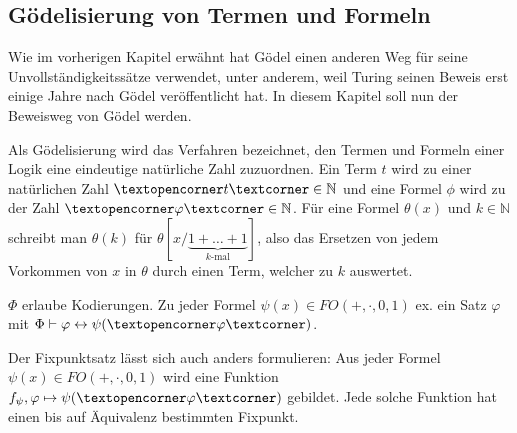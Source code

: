 \subsection{Gödelisierung von Termen und Formeln}

Wie im vorherigen Kapitel erwähnt hat Gödel einen anderen Weg für seine Unvollständigkeitssätze verwendet, unter anderem, weil Turing seinen Beweis erst einige Jahre nach Gödel veröffentlicht hat. In diesem Kapitel soll nun der Beweisweg von Gödel werden.

Als Gödelisierung wird das Verfahren bezeichnet, den Termen und Formeln einer Logik eine eindeutige natürliche Zahl zuzuordnen. Ein Term $t$ wird zu einer natürlichen Zahl $\opencorner t\closecorner\in \mathbb{N}$ und eine Formel $\phi$ wird zu der Zahl $\opencorner\varphi\closecorner\in \mathbb{N}$. Für eine Formel $\theta(x)$ und $k\in \mathbb{N}$ schreibt man $\theta(k)$ für $\theta[x/\underbrace{1+\dots+1}_{k\text{-mal}}]$, also das Ersetzen von jedem Vorkommen von $x$ in $\theta$ durch einen Term, welcher zu $k$ auswertet.

\begin{satz}[Fixpunktsatz]
	$\Phi$ erlaube Kodierungen. Zu jeder Formel $\psi(x)\in FO({+,\cdot,0,1})$ ex. ein Satz $\varphi$ mit $\Phi\vdash\varphi\leftrightarrow\psi(\opencorner \varphi \closecorner)$.
\end{satz}

Der Fixpunktsatz lässt sich auch anders formulieren: Aus jeder Formel $\psi(x)\in FO({+,\cdot,0,1})$ wird eine Funktion $f_\psi, \varphi\mapsto\psi(\opencorner\varphi\closecorner)$ gebildet. Jede solche Funktion hat einen bis auf Äquivalenz bestimmten Fixpunkt.

